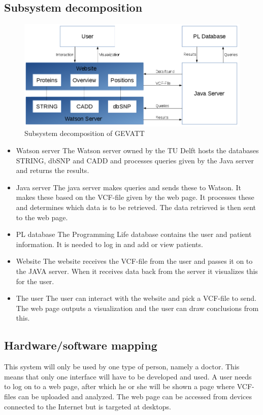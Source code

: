 	\subsection{Subsystem decomposition}
	\begin{figure}
		\centering
		\includegraphics[scale=0.5]{schema1-improvedv2.png}
		\caption{Subsystem decomposition of GEVATT}
	\end{figure}
		\begin{itemize}
			\item Watson server
				\subitem The Watson server owned by the TU Delft hosts the databases STRING\cite{franceschini2013string}, dbSNP\cite{sherry2001dbsnp} and CADD\cite{kircher2014general} and processes queries given by the Java server and returns the results.
			\item Java server
				\subitem The java server makes queries and sends these to Watson. It makes these based on the VCF-file given by the web page. It processes these and determines which data is to be retrieved. The data retrieved is then sent to the web page.
			\item PL database
				\subitem The Programming Life database contains the user and patient information. It is needed to log in and add or view patients.
			\item Website
				\subitem The website receives the VCF-file from the user and passes it on to the JAVA server. When it receives data back from the server it visualizes this for the user.
			\item The user 
				\subitem The user can interact with the website and pick a VCF-file to send. The web page outputs a visualization and the user can draw conclusions from this.
		\end{itemize}
	\subsection{Hardware/software mapping}
		This system will only be used by one type of person, namely a doctor. This means that only one interface will have to be developed and used. A user needs to log on to a web page, after which he or she will be shown a page where VCF-files can be uploaded and analyzed. The web page can be accessed from devices connected to the Internet but is targeted at desktops.
